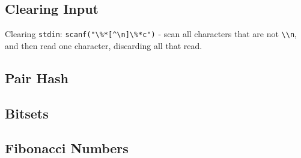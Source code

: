 \subsection{Clearing Input}

Clearing \verb|stdin|: \verb|scanf("\%*[^\n]\%*c")| - scan all characters that are not \verb|\\n|, and then read one character, discarding all that read.

\subsection{Pair Hash}



\subsection{Bitsets}



\subsection{Fibonacci Numbers}


